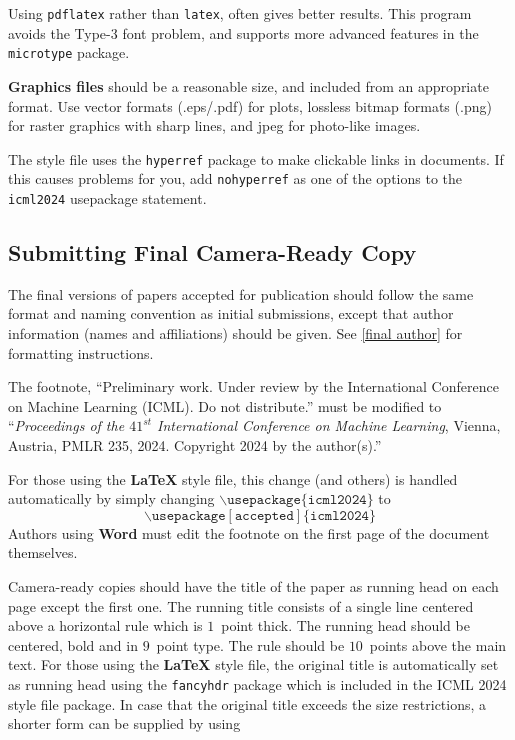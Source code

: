 \documentclass{article}
\theoremstyle{plain}
\theoremstyle{definition}
\theoremstyle{remark}
\begin{document}
Using \texttt{pdflatex} rather than \texttt{latex}, often gives better
results. This program avoids the Type-3 font problem, and supports more
advanced features in the \texttt{microtype} package.

\textbf{Graphics files} should be a reasonable size, and included from
an appropriate format. Use vector formats (.eps/.pdf) for plots,
lossless bitmap formats (.png) for raster graphics with sharp lines, and
jpeg for photo-like images.

The style file uses the \texttt{hyperref} package to make clickable
links in documents. If this causes problems for you, add
\texttt{nohyperref} as one of the options to the \texttt{icml2024}
usepackage statement.


\subsection{Submitting Final Camera-Ready Copy}

The final versions of papers accepted for publication should follow the
same format and naming convention as initial submissions, except that
author information (names and affiliations) should be given. See
\cref{final author} for formatting instructions.

The footnote, ``Preliminary work. Under review by the International
Conference on Machine Learning (ICML). Do not distribute.'' must be
modified to ``\textit{Proceedings of the
$\mathit{41}^{st}$ International Conference on Machine Learning},
Vienna, Austria, PMLR 235, 2024.
Copyright 2024 by the author(s).''

For those using the \textbf{\LaTeX} style file, this change (and others) is
handled automatically by simply changing
$\mathtt{\backslash usepackage\{icml2024\}}$ to
$$\mathtt{\backslash usepackage[accepted]\{icml2024\}}$$
Authors using \textbf{Word} must edit the
footnote on the first page of the document themselves.

Camera-ready copies should have the title of the paper as running head
on each page except the first one. The running title consists of a
single line centered above a horizontal rule which is $1$~point thick.
The running head should be centered, bold and in $9$~point type. The
rule should be $10$~points above the main text. For those using the
\textbf{\LaTeX} style file, the original title is automatically set as running
head using the \texttt{fancyhdr} package which is included in the ICML
2024 style file package. In case that the original title exceeds the
size restrictions, a shorter form can be supplied by using
\end{document}
